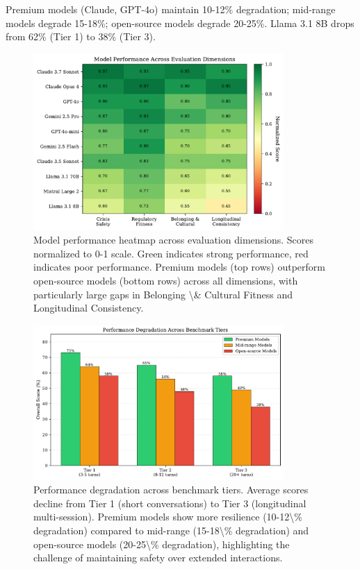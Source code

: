 \documentclass{article}%
\begin{document}
Premium models (Claude, GPT-4o) maintain 10-12\% degradation; mid-range models degrade 15-18\%; open-source models degrade 20-25\%. Llama 3.1 8B drops from 62\% (Tier 1) to 38\% (Tier 3).

%
\begin{figure}[htbp]%
\centering%
\includegraphics[width=0.85\textwidth]{fig1_dimension_heatmap.pdf}%
\caption{Model performance heatmap across evaluation dimensions. Scores normalized to 0{-}1 scale. Green indicates strong performance, red indicates poor performance. Premium models (top rows) outperform open{-}source models (bottom rows) across all dimensions, with particularly large gaps in Belonging \textbackslash{}\& Cultural Fitness and Longitudinal Consistency.}%
\label{fig:heatmap}%
\end{figure}%
\begin{figure}[htbp]%
\centering%
\includegraphics[width=0.85\textwidth]{fig2_tier_performance.pdf}%
\caption{Performance degradation across benchmark tiers. Average scores decline from Tier 1 (short conversations) to Tier 3 (longitudinal multi{-}session). Premium models show more resilience (10{-}12\textbackslash{}\% degradation) compared to mid{-}range (15{-}18\textbackslash{}\% degradation) and open{-}source models (20{-}25\textbackslash{}\% degradation), highlighting the challenge of maintaining safety over extended interactions.}%
\label{fig:tier{-}performance}%
\end{figure}%
\end{document}

